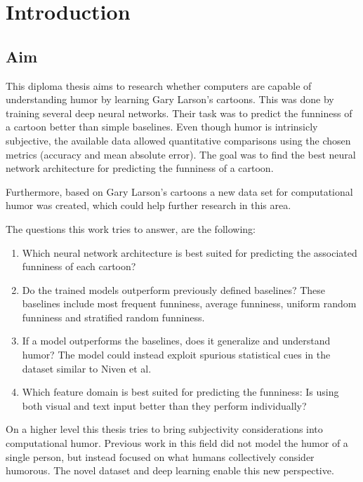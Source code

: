 \documentclass[draft,final,oneside]{vutinfth} %
\begin{document}
\chapter{Introduction}

\section{Aim} \label{aim}
This diploma thesis aims to research whether computers are capable of understanding humor by learning Gary Larson's cartoons. This was done by training several deep neural networks. Their task was to predict the funniness of a cartoon better than simple baselines. Even though humor is intrinsicly subjective, the available data allowed quantitative comparisons using the chosen metrics (accuracy and mean absolute error). The goal was to find the best neural network architecture for predicting the funniness of a cartoon.

Furthermore, based on Gary Larson's cartoons a new data set for computational humor was created, which could help further research in this area.

The questions this work tries to answer, are the following:

\begin{enumerate}

\item Which neural network architecture is best suited for predicting the associated funniness of each cartoon?

\item Do the trained models outperform previously defined baselines? These baselines include most frequent funniness, average funniness, uniform random funniness and stratified random funniness.

\item If a model outperforms the baselines, does it generalize and understand humor? The model could instead exploit spurious statistical cues in the dataset similar to Niven et al. \cite{cleverhans}

\item Which feature domain is best suited for predicting the funniness: Is using both visual and text input better than they perform individually?

\end{enumerate}

On a higher level this thesis tries to bring subjectivity considerations into computational humor. Previous work in this field did not model the humor of a single person, but instead focused on what humans collectively consider humorous. The novel dataset and deep learning enable this new perspective.
\end{document}
